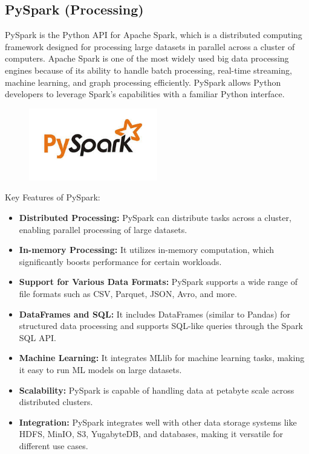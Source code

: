 \documentclass[12pt,a4paper]{article}
\begin{document}
\subsection{PySpark (Processing)}
PySpark is the Python API for Apache Spark, which is a distributed computing
framework designed for processing large datasets in parallel across a cluster of
computers. Apache Spark is one of the most widely used big data processing
engines because of its ability to handle batch processing, real-time streaming,
machine learning, and graph processing efficiently. PySpark allows Python
developers to leverage Spark’s capabilities with a familiar Python interface.
\begin{figure}[H]
    \begin{center}
        \includegraphics[width=0.5\textwidth]{Images/pySpark.png}
    \end{center}
\end{figure}
Key Features of PySpark:
\begin{itemize}
    \item \textbf{Distributed Processing:} PySpark can distribute tasks across a
    cluster, enabling parallel processing of large datasets.
    \item \textbf{In-memory Processing:} It utilizes in-memory computation,
    which significantly boosts performance for certain workloads.
    \item \textbf{Support for Various Data Formats:} PySpark supports a wide
    range of file formats such as CSV, Parquet, JSON, Avro, and more.
    \item \textbf{DataFrames and SQL:} It includes DataFrames (similar to
    Pandas) for structured data processing and supports SQL-like queries through
    the Spark SQL API.
    \item \textbf{Machine Learning:} It integrates MLlib for machine learning
    tasks, making it easy to run ML models on large datasets.
    \item \textbf{Scalability:} PySpark is capable of handling data at petabyte
    scale across distributed clusters.
    \item \textbf{Integration:} PySpark integrates well with other data storage
    systems like HDFS, MinIO, S3, YugabyteDB, and databases, making it versatile
    for different use cases.
\end{itemize}
\end{document}
